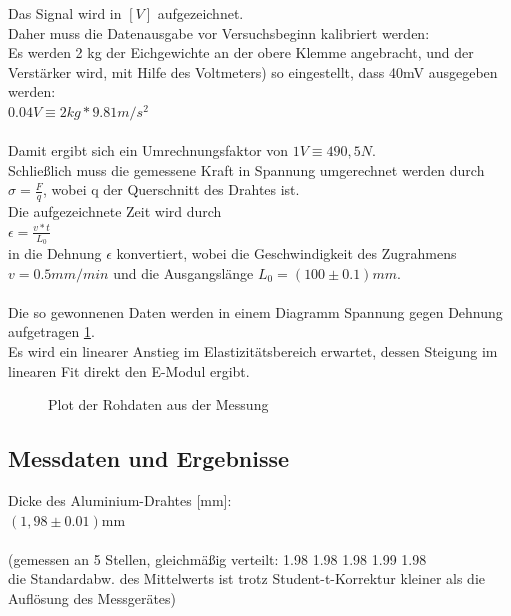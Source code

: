 \documentclass[12pt,a4paper]{article}
\begin{document}
\begin{multicols}{2}
Das Signal wird in $[V]$ aufgezeichnet.\\
Daher muss die Datenausgabe vor Versuchsbeginn kalibriert werden:\\
Es werden 2 kg der Eichgewichte an der obere Klemme angebracht, und der Verstärker wird, mit Hilfe des Voltmeters) so eingestellt, dass 40mV ausgegeben werden:\\
$0.04 V \equiv 2 kg * 9.81 m/s^2 $\\
\\
Damit ergibt sich ein Umrechnungsfaktor von $1V \equiv 490,5 N $.\\
Schließlich muss die gemessene Kraft in Spannung umgerechnet werden durch $\sigma = \frac{F}{q}$, wobei q der Querschnitt des Drahtes ist.\\
Die aufgezeichnete Zeit wird durch\\
$ \epsilon = \frac{v*t}{L_{0}} $\\
in die Dehnung $\epsilon$ konvertiert, wobei die Geschwindigkeit des Zugrahmens\\
 $v = 0.5 mm/min$ und die Ausgangslänge $ L_{0} = (100 \pm 0.1) mm $.\\
\\
Die so gewonnenen Daten werden in einem Diagramm Spannung gegen Dehnung aufgetragen \ref{fig:orig_Vs_plot}.\\
Es wird ein linearer Anstieg im Elastizitätsbereich erwartet, dessen Steigung im linearen Fit direkt den E-Modul ergibt.\\

\begin{figure}[H]
    	\caption{Plot der Rohdaten aus der Messung}
	\label{fig:orig_Vs_plot}
\end{figure}


\subsection{Messdaten und Ergebnisse}
Dicke des Aluminium-Drahtes [mm]:\\
$(1,98\pm 0.01)$mm\\
\\
(gemessen an 5 Stellen, gleichmäßig verteilt:
1.98
1.98
1.98
1.99
1.98\\
die Standardabw. des Mittelwerts ist trotz Student-t-Korrektur kleiner als die Auflösung des Messgerätes)\\


\end{multicols}
\end{document}
